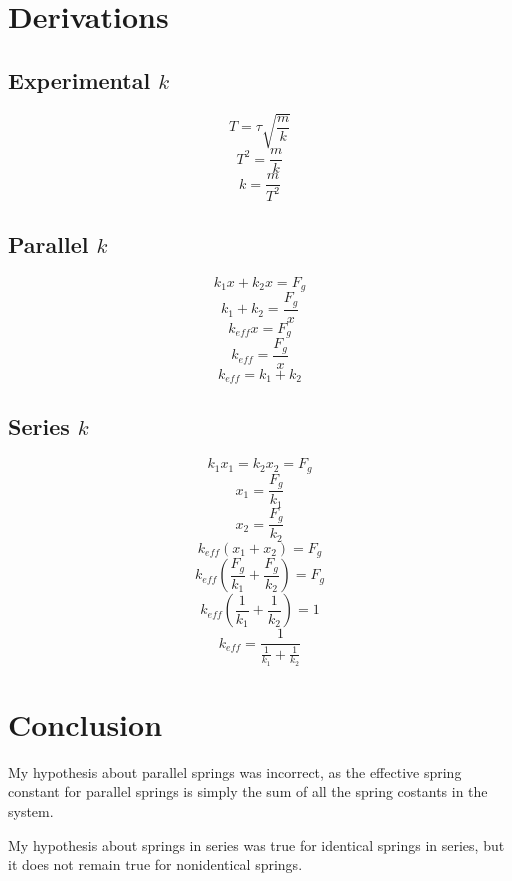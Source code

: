 \documentclass{article}
\begin{document}
\section{Derivations}
\subsection{Experimental $k$}
\[T = \tau\sqrt{\frac{m}{k}}\]
\[T^2 = \frac{m}{k}\]
\[k = \frac{m}{T^2}\]
\subsection{Parallel $k$}
\[k_1x + k_2x = F_g\]
\[k_1 + k_2 = \frac{F_g}{x}\]
\[k_{eff}x = F_g\]
\[k_{eff} = \frac{F_g}{x}\]
\[k_{eff} = k_1 + k_2\]
\subsection{Series $k$}
\[k_1x_1 = k_2x_2 = F_g\]
\[x_1 = \frac{F_g}{k_1}\]
\[x_2 = \frac{F_g}{k_2}\]
\[k_{eff}(x_1 + x_2) = F_g\]
\[k_{eff}(\frac{F_g}{k_1} + \frac{F_g}{k_2}) = F_g\]
\[k_{eff}(\frac{1}{k_1} + \frac{1}{k_2}) = 1\]
\[k_{eff} = \frac{1}{\frac{1}{k_1} + \frac{1}{k_2}}\]
\section{Conclusion}
My hypothesis about parallel springs was incorrect, as the effective spring constant for parallel springs is simply the sum of all the spring costants in the system.

\noindent
My hypothesis about springs in series was true for identical springs in series, but it does not remain true for nonidentical springs.
\end{document}
